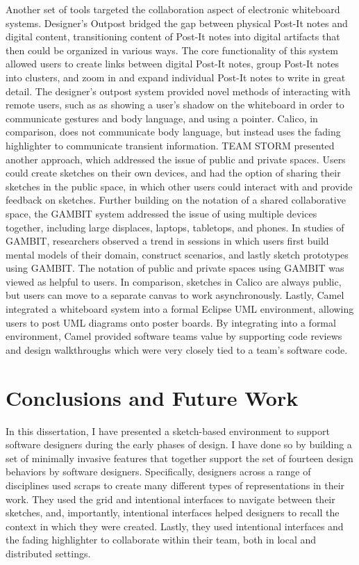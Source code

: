\documentclass[12pt,fleqn]{ucithesis}
\begin{document}
Another set of tools targeted the collaboration aspect of electronic whiteboard systems. Designer's Outpost \citep{klemmer2001designers} bridged the gap between physical Post-It notes and digital content, transitioning content of Post-It notes into digital artifacts that then could be organized in various ways. The core functionality of this system allowed users to create links between digital Post-It notes, group Post-It notes into clusters, and zoom in and expand individual Post-It notes to write in great detail. The designer's outpost system provided novel methods of interacting with remote users, such as as showing a user's shadow on the whiteboard in order to communicate gestures and body language, and using a pointer. Calico, in comparison, does not communicate body language, but instead uses the fading highlighter to communicate transient information. TEAM STORM \citep{Hailpern} presented another approach, which addressed the issue of public and private spaces. Users could create sketches on their own devices, and had the option of sharing their sketches in the public space, in which other users could interact with and provide feedback on sketches. Further building on the notation of a shared collaborative space, the GAMBIT \cite{Sangiorgi:2012:GAM:2305484.2305527} system addressed the issue of using multiple devices together, including large displaces, laptops, tabletops, and phones. In studies of GAMBIT, researchers observed a trend in sessions in which users first build mental models of their domain, construct scenarios, and lastly sketch prototypes using GAMBIT. The notation of public and private spaces using GAMBIT was viewed as helpful to users. In comparison, sketches in Calico are always public, but users can move to a separate canvas to work asynchronously. Lastly, Camel \cite{cataldo2009camel} integrated a whiteboard system into a formal Eclipse UML environment, allowing users to post UML diagrams onto poster boards. By integrating into a formal environment, Camel provided software teams value by supporting code reviews and design walkthroughs which were very closely tied to a team's software code. 

 \newpage 
 \newpage \chapter{Conclusions and Future Work}
\label{chapter:conclusions}


In this dissertation, I have presented a sketch-based environment to support software designers during the early phases of design. I have done so by building a set of minimally invasive features that together support the set of fourteen design behaviors by software designers. Specifically, designers across a range of disciplines used scraps to create many different types of representations in their work. They used the grid and intentional interfaces to navigate between their sketches, and, importantly, intentional interfaces helped designers to recall the context in which they were created. Lastly, they used intentional interfaces and the fading highlighter to collaborate within their team, both in local and distributed settings.
\end{document}
